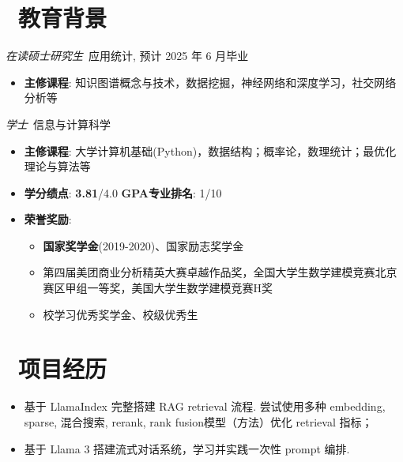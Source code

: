 \documentclass{resume}
\begin{document}



\section{\faGraduationCap\  教育背景}
\textit{在读硕士研究生}\ 应用统计, 预计 2025 年 6 月毕业
\begin{itemize}
	\item \textbf{主修课程}: 知识图谱概念与技术，数据挖掘，神经网络和深度学习，社交网络分析等
\end{itemize}

\textit{学士}\ 信息与计算科学
\begin{itemize}
	\item \textbf{主修课程}: 大学计算机基础(Python)，数据结构；概率论，数理统计；最优化理论与算法等
	\item \textbf{学分绩点}: \textbf{3.81}/4.0 \quad \textbf{GPA专业排名}: 1/10
	\item \textbf{荣誉奖励}:
	      \begin{itemize}[label=$\ast$]
		      \item \textbf{国家奖学金}(2019-2020)、国家励志奖学金
		      \item 第四届美团商业分析精英大赛卓越作品奖，全国大学生数学建模竞赛北京赛区甲组一等奖，美国大学生数学建模竞赛H奖
		      \item 校学习优秀奖学金、校级优秀生
	      \end{itemize}
\end{itemize}

\section{\faUsers\ 项目经历}
\begin{itemize}
	\item 基于 LlamaIndex 完整搭建 RAG retrieval 流程. 尝试使用多种 embedding, sparse, 混合搜索, rerank, rank fusion模型（方法）优化 retrieval 指标；
	\item 基于 Llama 3 搭建流式对话系统，学习并实践一次性 prompt 编排.
\end{itemize}
\end{document}
